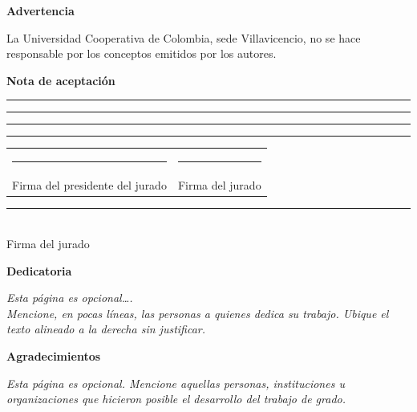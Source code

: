 \documentclass[12pt, letterpaper]{article}
\begin{document}
\newpage
\thispagestyle{empty}
\begin{center}
    \vspace*{3cm}
    {\large \bfseries Advertencia\par}
    \vspace{2cm}
    \large
    La Universidad Cooperativa de Colombia, sede Villavicencio, no se hace responsable por los conceptos emitidos por los autores.
\end{center}

\newpage
\thispagestyle{empty}
\begin{center}
    \vspace*{3cm}
    {\large \bfseries Nota de aceptación\par}
    \vspace{2cm}
    \rule{15cm}{0.4pt}
    \rule{15cm}{0.4pt}
    \rule{15cm}{0.4pt}
    \rule{15cm}{0.4pt}
    \vspace{4cm}
\end{center}
\begin{flushleft}
    \large
    \begin{tabular}{p{7cm}p{7cm}}
        \rule{7cm}{0.4pt} & \rule{7cm}{0.4pt} \\
        Firma del presidente del jurado & Firma del jurado \\
    \end{tabular}
    \vspace{2cm}
    \begin{center}
        \rule{7cm}{0.4pt}\\
        Firma del jurado
    \end{center}
\end{flushleft}

\newpage
\thispagestyle{empty}
\begin{flushright}
    \vspace*{3cm}
    {\large \bfseries Dedicatoria\par}
    \vspace{2cm}
    \textit{Esta página es opcional….\\ 
    Mencione, en pocas líneas, las personas a quienes dedica su trabajo. Ubique el texto alineado a la derecha sin justificar.}
\end{flushright}

\newpage
\thispagestyle{empty}
\begin{center}
    \vspace*{3cm}
    {\large \bfseries Agradecimientos\par}
    \vspace{2cm}
    \textit{Esta página es opcional. Mencione aquellas personas, instituciones u organizaciones que hicieron posible el desarrollo del trabajo de grado.}
\end{center}
\end{document}
